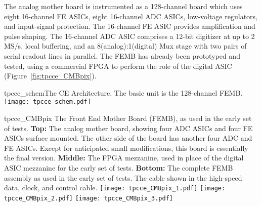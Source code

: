 The analog mother board is instrumented as a 128-channel board which uses eight 16-channel FE ASICs,
eight 16-channel ADC ASICs, low-voltage regulators, and input-signal protection.
The 16-channel FE ASIC provides amplification and pulse shaping.
The 16-channel ADC ASIC comprises a 12-bit digitizer at up to 2 MS/s, local buffering,
and an 8(analog):1(digital) Mux stage with two pairs of serial readout lines in parallel.
The FEMB has already been prototyped and tested,
using a commercial FPGA to perform the role of the digital ASIC (Figure~\ref{fig:tpcce_CMBpix}).

\begin{cdrfigure}{tpcce_schem}{The CE Architecture. The basic unit is the 128-channel FEMB.}
\texttt{[image: tpcce\_schem.pdf]}
\end{cdrfigure}

\begin{cdrfigure}{tpcce_CMBpix}
{The Front End Mother Board (FEMB), as used in the early set of tests.
  {\bf Top:} The analog mother board, showing four ADC ASICs and four FE ASICs surface mounted.
  The other side of the board has another four ADC and FE ASICs.
  Except for anticipated small modifications, this board is essentially the final version.
  {\bf Middle:} The FPGA mezzanine, used in place of the digital ASIC mezzanine for the early set of tests.
  {\bf Bottom:} The complete FEMB assembly as used in the early set of tests.
  The cable shown in the high-speed data, clock, and control cable.}
\texttt{[image: tpcce\_CMBpix\_1.pdf]}
\texttt{[image: tpcce\_CMBpix\_2.pdf]}
\texttt{[image: tpcce\_CMBpix\_3.pdf]}
\end{cdrfigure}

